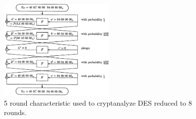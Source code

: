 \documentclass[twoside]{article}
\begin{document}
\begin{figure}[!ht]
    \centering
    \includegraphics[width=0.5\textwidth]{images/des_8round_char.png}
    \caption{5 round characteristic used to cryptanalyze DES reduced to 8 rounds.}
    \label{fig:des-8-char}
\end{figure}
\end{document}
